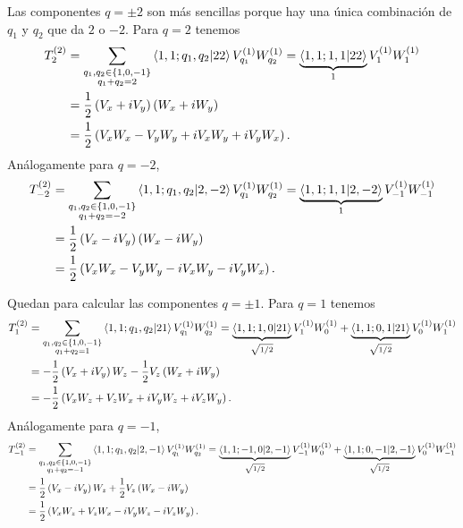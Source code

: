 \documentclass[10pt, a4paper]{article}
\numberwithin{equation}{subsection}
\begin{document}
Las componentes $q = \pm2$ son más sencillas porque hay una única combinación
de $q_1$ y $q_2$ que da $2$ o $-2$. Para $q = 2$ tenemos
\begin{align}
  T^{(2)}_2 &= \sum_{\substack{q_1,q_2\in\set{1,0,-1} \\ q_1 + q_2 = 2}}
    \braket{1,1;q_1,q_2}{22} V^{(1)}_{q_1} W^{(1)}_{q_2}
    = \underbrace{\braket{1,1;1,1}{22}}_{1} V^{(1)}_{1} W^{(1)}_{1} \nonumber
    \\
  &= \frac{1}{2}\left(V_x +iV_y\right)\left(W_x +iW_y\right) \\
  &= \frac{1}{2}\left(V_xW_x - V_yW_y + iV_xW_y + iV_yW_x\right).
\end{align}
Análogamente para $q = -2$,
\begin{align}
  T^{(2)}_{-2} &= \sum_{\substack{q_1,q_2\in\set{1,0,-1} \\ q_1 + q_2 = -2}}
    \braket{1,1;q_1,q_2}{2,-2} V^{(1)}_{q_1} W^{(1)}_{q_2}
    = \underbrace{\braket{1,1;1,1}{2,-2}}_{1} V^{(1)}_{-1} W^{(1)}_{-1}
    \nonumber \\
  &= \frac{1}{2}\left(V_x -iV_y\right)\left(W_x -iW_y\right) \\
  &= \frac{1}{2}\left(V_xW_x - V_yW_y - iV_xW_y - iV_yW_x\right).
\end{align}

Quedan para calcular las componentes $q = \pm1$. Para $q = 1$ tenemos
\begin{align}
  T^{(2)}_{1} &= \sum_{\substack{q_1,q_2\in\set{1,0,-1} \\ q_1 + q_2 = 1}}
    \braket{1,1;q_1,q_2}{21} V^{(1)}_{q_1} W^{(1)}_{q_2}
    = \underbrace{\braket{1,1;1,0}{21}}_{\sqrt{1/2}} V^{(1)}_{1} W^{(1)}_{0} +
    \underbrace{\braket{1,1;0,1}{21}}_{\sqrt{1/2}} V^{(1)}_{0} W^{(1)}_{1}
    \nonumber \\
  &= -\frac{1}{2}\left(V_x+iV_y\right)W_z -\frac{1}{2}V_z\left(W_x+iW_y\right)
    \nonumber \\
  &= -\frac{1}{2}\left(V_xW_z + V_zW_x + iV_yW_z + iV_zW_y\right).
\end{align}
Análogamente para $q = -1$,
\begin{align}
  T^{(2)}_{-1} &= \sum_{\substack{q_1,q_2\in\set{1,0,-1} \\ q_1 + q_2 = -1}}
    \braket{1,1;q_1,q_2}{2,-1} V^{(1)}_{q_1} W^{(1)}_{q_2}
    = \underbrace{\braket{1,1;-1,0}{2,-1}}_{\sqrt{1/2}}V^{(1)}_{-1}W^{(1)}_{0}
    + \underbrace{\braket{1,1;0,-1}{2,-1}}_{\sqrt{1/2}}V^{(1)}_{0}W^{(1)}_{-1}
    \nonumber \\
  &= \frac{1}{2}\left(V_x-iV_y\right)W_z + \frac{1}{2}V_z\left(W_x-iW_y\right)
    \nonumber \\
  &= \frac{1}{2}\left(V_xW_z + V_zW_x - iV_yW_z - iV_zW_y\right).
\end{align}
\end{document}
